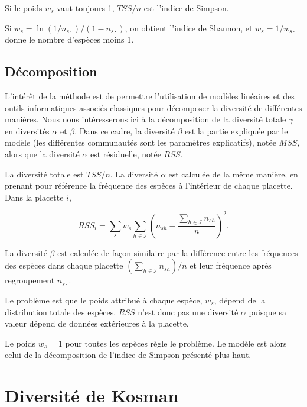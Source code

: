 \documentclass[
  11pt,
  french,
  a4paper,
  extrafontsizes,onecolumn,openright
  ]{memoir}
\begin{document}
Si le poids \(w_s\) vaut toujours 1, \(\mathit{TSS}/{n}\) est l'indice de Simpson.

Si \(w_s={\ln{\left(1/{n_{s\cdot}}\right)}/{\left(1-n_{s\cdot}\right)}}\), on obtient l'indice de Shannon, et \(w_s={1}/{w_{s\cdot}}\) donne le nombre d'espèces moins 1.

\hypertarget{sec-PCdecomposition}{%
\subsection{Décomposition}\label{sec-PCdecomposition}}

L'intérêt de la méthode est de permettre l'utilisation de modèles linéaires et des outils informatiques associés classiques pour décomposer la diversité de différentes manières.
Nous nous intéresserons ici à la décomposition de la diversité totale \(\gamma\) en diversités \(\alpha\) et \(\beta\).
Dans ce cadre, la diversité \(\beta\) est la partie expliquée par le modèle (les différentes communautés sont les paramètres explicatifs), notée \(\mathit{MSS}\), alors que la diversité \(\alpha\) est résiduelle, notée \(\mathit{RSS}\).

La diversité totale est \(\mathit{TSS}/{n}\).
La diversité \(\alpha\) est calculée de la même manière, en prenant pour référence la fréquence des espèces à l'intérieur de chaque placette.
Dans la placette \(i\),

\begin{equation}
  \mathit{RSS}_i = \sum_s{w_s\sum_{h\in {\mathcal I}}{{\left(n_{sh} - \frac{\sum_{h\in {\mathcal I}}{n_{sh}}}{n}\right)}^2}}.
\end{equation}

La diversité \(\beta\) est calculée de façon similaire par la différence entre les fréquences des espèces dans chaque placette \({\left(\sum_{h\in {\mathcal I}}{n_{sh}}\right)}/{n}\) et leur fréquence après regroupement \(n_{s\cdot}\).

Le problème est que le poids attribué à chaque espèce, \(w_s\), dépend de la distribution totale des espèces.
\(\mathit{RSS}\) n'est donc pas une diversité \(\alpha\) puisque sa valeur dépend de données extérieures à la placette.

Le poids \(w_s=1\) pour toutes les espèces règle le problème.
Le modèle est alors celui de la décomposition de l'indice de Simpson présenté plus haut.

\hypertarget{diversituxe9-de-kosman}{%
\section{Diversité de Kosman}\label{diversituxe9-de-kosman}}
\end{document}
